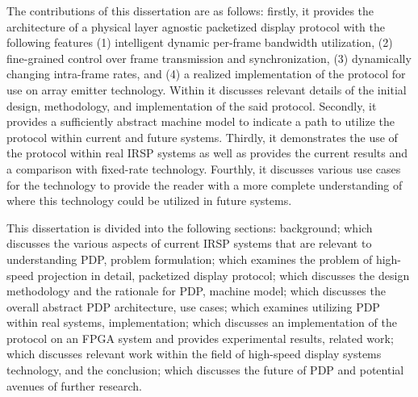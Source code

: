 The contributions of this dissertation are as follows: firstly, it provides the architecture of a physical layer agnostic packetized display protocol with the following features (1) intelligent dynamic per-frame bandwidth utilization, (2) fine-grained control over frame transmission and synchronization, (3) dynamically changing intra-frame rates, and (4) a realized implementation of the protocol for use on array emitter technology. Within it discusses relevant details of the initial design, methodology, and implementation of the said protocol. Secondly, it provides a sufficiently abstract machine model to indicate a path to utilize the protocol within current and future systems. Thirdly, it demonstrates the use of the protocol within real IRSP systems as well as provides the current results and a comparison with fixed-rate technology. Fourthly, it discusses various use cases for the technology to provide the reader with a more complete understanding of where this technology could be utilized in future systems.

This dissertation is divided into the following sections: background; which discusses the various aspects of current IRSP systems that are relevant to understanding PDP, problem formulation; which examines the problem of high-speed projection in detail, packetized display protocol; which discusses the design methodology and the rationale for PDP, machine model; which discusses the overall abstract PDP architecture, use cases; which examines utilizing PDP within real systems, implementation; which discusses an implementation of the protocol on an FPGA system and provides experimental results, related work; which discusses relevant work within the field of high-speed display systems technology, and the conclusion; which discusses the future of PDP and potential avenues of further research.
